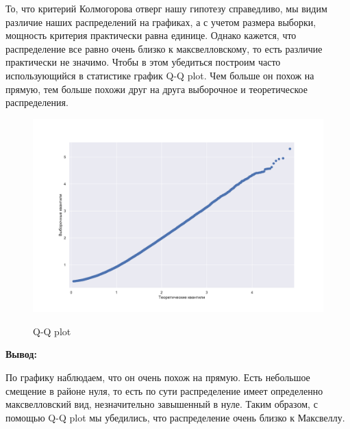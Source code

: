 \documentclass[twoside,twocolumn, 11pt]{article}
\theoremstyle{plain}
\theoremstyle{definition}
\begin{document}
\indent То, что критерий Колмогорова отверг нашу гипотезу справедливо, мы видим различие наших распределений на графиках, а с учетом размера выборки, мощность критерия практически равна единице.
Однако кажется, что распределение все равно очень близко к максвелловскому, то есть различие практически не значимо. Чтобы в этом убедиться построим часто использующийся в статистике график Q-Q plot. Чем больше он похож на прямую, тем больше похожи друг на друга выборочное и теоретическое распределения.
\begin{figure}[!h]
{\includegraphics[width=1\linewidth]{qqplot}}
\caption{Q-Q plot}
\end{figure}

\textbf{Вывод:}

По графику наблюдаем, что он очень похож на прямую. Есть небольшое смещение в районе нуля, то есть по сути распределение имеет определенно максвелловский вид, незначительно завышенный в нуле.
Таким образом, с помощью Q-Q plot мы убедились, что распределение очень близко к Максвеллу.
\end{document}
